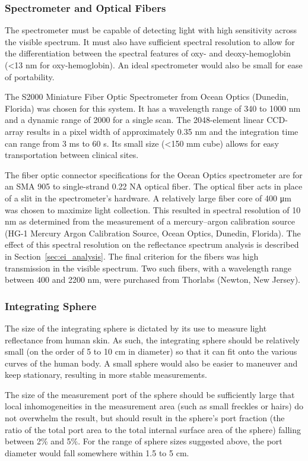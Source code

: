 \subsubsection{Spectrometer and Optical Fibers}
The spectrometer must be capable of detecting light with high sensitivity across the visible spectrum. It must also have sufficient spectral resolution to allow for the differentiation between the spectral features of oxy- and deoxy-hemoglobin (<13 nm for oxy-hemoglobin). An ideal spectrometer would also be small for ease of portability.

The S2000 Miniature Fiber Optic Spectrometer from Ocean Optics (Dunedin, Florida) was chosen for this system. It has a wavelength range of 340 to 1000 nm and a dynamic range of 2000 for a single scan. The 2048-element linear CCD-array results in a pixel width of approximately 0.35 nm and the integration time can range from 3 ms to 60 s. Its small size (<150 mm cube) allows for easy transportation between clinical sites.

The fiber optic connector specifications for the Ocean Optics spectrometer are for an SMA 905 to single-strand 0.22 NA optical fiber. The optical fiber acts in place of a slit in the spectrometer’s hardware. A relatively large fiber core of 400 \si{\um} was chosen to maximize light collection. This resulted in spectral resolution of 10 nm as determined from the measurement of a mercury–argon calibration source (HG-1 Mercury Argon Calibration Source, Ocean Optics, Dunedin, Florida). The effect of this spectral resolution on the reflectance spectrum analysis is described in Section~\ref{sec:ei_analysis}. The final criterion for the fibers was high transmission in the visible spectrum. Two such fibers, with a wavelength range between 400 and 2200 nm, were purchased from Thorlabs (Newton, New Jersey).

\subsubsection{Integrating Sphere}
The size of the integrating sphere is dictated by its use to measure light reflectance from human skin. As such, the integrating sphere should be relatively small (on the order of 5 to 10 cm in diameter) so that it can fit onto the various curves of the human body. A small sphere would also be easier to maneuver and keep stationary, resulting in more stable measurements.

The size of the measurement port of the sphere should be sufficiently large that local inhomogeneities in the measurement area (such as small freckles or hairs) do not overwhelm the result, but should result in the sphere’s port fraction (the ratio of the total port area to the total internal surface area of the sphere) falling between 2\% and 5\%.\cite{Hanssen2002} For the range of sphere sizes suggested above, the port diameter would fall somewhere within 1.5 to 5 cm.

